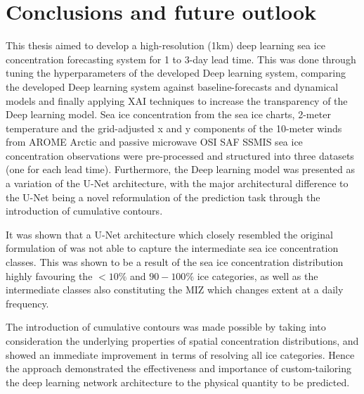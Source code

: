 \documentclass[../main/thesis.tex]{subfiles}
\begin{document}
\section{Conclusions and future outlook}
\label{sec:conclusions}
This thesis aimed to develop a high-resolution (1km) deep learning sea ice concentration forecasting system for 1 to 3-day lead time. This was done through tuning the hyperparameters of the developed Deep learning system, comparing the developed Deep learning system against baseline-forecasts and dynamical models and finally applying XAI techniques to increase the transparency of the Deep learning model. Sea ice concentration from the sea ice charts, 2-meter temperature and the grid-adjusted x and y components of the 10-meter winds from AROME Arctic and passive microwave OSI SAF SSMIS sea ice concentration observations were pre-processed and structured into three datasets (one for each lead time). Furthermore, the Deep learning model was presented as a variation of the U-Net architecture, with the major architectural difference to the U-Net being a novel reformulation of the prediction task through the introduction of cumulative contours.

It was shown that a U-Net architecture which closely resembled the original formulation of \citet{Ronneberger2015} was not able to capture the intermediate sea ice concentration classes. This was shown to be a result of the sea ice concentration distribution highly favouring the $<10\%$ and $90 - 100\%$ ice categories, as well as the intermediate classes also constituting the MIZ which changes extent at a daily frequency.

The introduction of cumulative contours was made possible by taking into consideration the underlying properties of spatial concentration distributions, and showed an immediate improvement in terms of resolving all ice categories. Hence the approach demonstrated the effectiveness and importance of custom-tailoring the deep learning network architecture to the physical quantity to be predicted.
\end{document}
